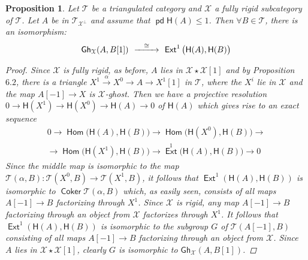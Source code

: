 \documentclass[oneside, a4paper,reqno]{amsart}
\numberwithin{equation}{section}
\newtheorem{prop}[thm]{Proposition}
\theoremstyle{definition}
\begin{document}
\begin{prop} Let ${\mathcal T}$ be a triangulated category and ${\mathcal X}$ a fully rigid subcategory  of ${\mathcal T}$. Let $A$ be in ${\mathcal T}_{{\mathcal X}^{\bot}}$ and assume that $\operatorname{\mathsf{pd}}\mathsf{H}(A) \leq 1$. Then $\forall B \in{\mathcal T}$, there is an isomorphism:
\[
\begin{CD}
\mathsf{Gh}_{\mathcal X}(A,B[1]) \,  @> \cong >> \, \operatorname*{\mathsf{Ext}}^{1}\big(\mathsf{H}(A),\mathsf{H}(B) \big)
\end{CD}
\]
\begin{proof} Since ${\mathcal X}$ is fully rigid, as before, $A$ lies in ${\mathcal X}\star{\mathcal X}[1]$ and by Proposition $6.2$, there is a triangle $X^{1} \stackrel{\alpha}{\longrightarrow} X^{0} {\longrightarrow} A {\longrightarrow} X^{1}[1]$ in ${\mathcal T}$, where the $X^{i}$ lie in ${\mathcal X}$ and the map $A[-1] {\longrightarrow} X$ is ${\mathcal X}$-ghost. Then we have a projective resolution $0 {\longrightarrow} \mathsf{H}(X^{1}) {\longrightarrow} \mathsf{H}(X^{0}) {\longrightarrow} \mathsf{H}(A) {\longrightarrow} 0$ of $\mathsf{H}(A)$  which gives rise to an exact sequence 
\begin{multline}
0 {\longrightarrow} \operatorname{\mathsf{Hom}}\big(\mathsf{H}(A),\mathsf{H}(B)\big) {\longrightarrow} \operatorname{\mathsf{Hom}}\big(\mathsf{H}(X^{0}),\mathsf{H}(B)\big) {\longrightarrow} \\ {\longrightarrow}  \operatorname{\mathsf{Hom}}\big(\mathsf{H}(X^{1}),\mathsf{H}(B)\big)  {\longrightarrow} \operatorname*{\mathsf{Ext}}^{1}\big(\mathsf{H}(A),\mathsf{H}(B)\big) {\longrightarrow} 0
\end{multline}
Since the middle map is isomorphic to the map ${\mathcal T}(\alpha,B) \colon {\mathcal T}(X^{0},B) {\longrightarrow} {\mathcal T}(X^{1},B)$, it follows that $\operatorname*{\mathsf{Ext}}^{1}(\mathsf{H}(A),\mathsf{H}(B))$ is isomorphic to $\operatorname*{\mathsf{Coker}}{\mathcal T}(\alpha,B)$ which, as easily seen, consists of all maps $A[-1] {\longrightarrow} B$ factorizing through $X^{1}$. Since ${\mathcal X}$ is rigid, any map $A[-1] {\longrightarrow} B$ factorizing  through an object from ${\mathcal X}$ factorizes through $X^{1}$. It follows that $\operatorname*{\mathsf{Ext}}^{1}(\mathsf{H}(A),\mathsf{H}(B))$ is isomorphic to the subgroup $G$ of ${\mathcal T}(A[-1],B)$ consisting of all maps $A[-1] {\longrightarrow} B$ factorizing through an object from ${\mathcal X}$. Since $A$ lies in ${\mathcal X}\star{\mathcal X}[1]$, clearly $G$ is isomorphic to $\mathsf{Gh}_{\mathcal X}(A,B[1])$. 
\end{proof} 
\end{prop} 
\end{document}
